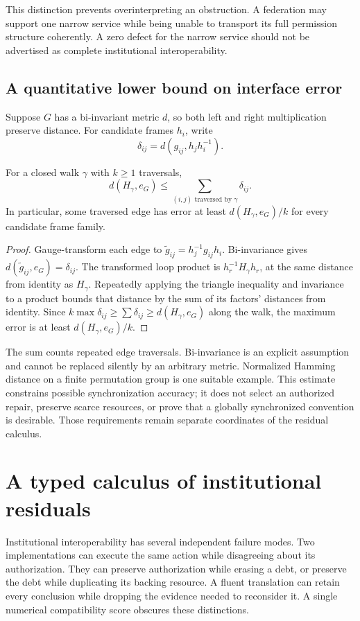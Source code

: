 This distinction prevents overinterpreting an obstruction. A federation may support one narrow service while being unable to transport its full permission structure coherently. A zero defect for the narrow service should not be advertised as complete institutional interoperability.

\subsection{A quantitative lower bound on interface error}
Suppose $G$ has a bi-invariant metric $d$, so both left and right multiplication preserve distance. For candidate frames $h_i$, write
\[
\delta_{ij}=d(g_{ij},h_jh_i^{-1}).
\]
\begin{MSproposition}\label{MS:prop:holonomybound}
For a closed walk $\gamma$ with $k\ge1$ traversals,
\[
d(H_\gamma,e_G)\le\sum_{(i,j)\text{ traversed by }\gamma}\delta_{ij}.
\]
In particular, some traversed edge has error at least $d(H_\gamma,e_G)/k$ for every candidate frame family.
\end{MSproposition}
\begin{proof}
Gauge-transform each edge to $\widetilde g_{ij}=h_j^{-1}g_{ij}h_i$. Bi-invariance gives $d(\widetilde g_{ij},e_G)=\delta_{ij}$. The transformed loop product is $h_r^{-1}H_\gamma h_r$, at the same distance from identity as $H_\gamma$. Repeatedly applying the triangle inequality and invariance to a product bounds that distance by the sum of its factors' distances from identity. Since $k\max\delta_{ij}\ge\sum\delta_{ij}\ge d(H_\gamma,e_G)$ along the walk, the maximum error is at least $d(H_\gamma,e_G)/k$.
\end{proof}

The sum counts repeated edge traversals. Bi-invariance is an explicit assumption and cannot be replaced silently by an arbitrary metric. Normalized Hamming distance on a finite permutation group is one suitable example. This estimate constrains possible synchronization accuracy; it does not select an authorized repair, preserve scarce resources, or prove that a globally synchronized convention is desirable. Those requirements remain separate coordinates of the residual calculus.

\section{A typed calculus of institutional residuals}\label{MS:sec:residuals}
Institutional interoperability has several independent failure modes. Two implementations can execute the same action while disagreeing about its authorization. They can preserve authorization while erasing a debt, or preserve the debt while duplicating its backing resource. A fluent translation can retain every conclusion while dropping the evidence needed to reconsider it. A single numerical compatibility score obscures these distinctions.

